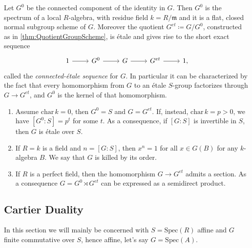 \begin{thm}\label{thm:ConnectedEtaleSequenceGS}
	Let $G^0$ be the connected component of the identity in $G$.
	Then $G^0$ is the spectrum of a local $R$-algebra, with residue field $k = R/\mathfrak{m}$
	and it is a flat, closed normal subgroup scheme of $G$.
	Moreover the quotient $G^{et} \coloneqq G/G^0$,
	constructed as in \cref{thm:QuotientGroupScheme},
	is étale and gives rise to the short exact sequence
	\begin{equation*}
	\begin{tikzcd}
		1 \arrow[r, "", rightarrow] &
		G^0 \arrow[r, "", rightarrow] &
		G \arrow[r, "", rightarrow] &
		G^{et} \arrow[r, "", rightarrow] &
		1
	,\end{tikzcd}
	\end{equation*}
	called the {\em connected-étale sequence} for $G$.
	In particular it can be characterized by the fact that every homomorphism
	from $G$ to an étale $S$-group factorizes through $G \to G^{et}$,
	and $G^0$ is the kernel of that homomorphism.
\end{thm}


\begin{prop}\label{prop:PropertiesConnectedEtale}
\leavevmode\vspace{-.2\baselineskip}
\begin{enumerate}
	\item Assume $\mathrm{char}\, k = 0$, then $G^0 = S$
		and $G = G^{et}$.
		If, instead, $\mathrm{char}\, k = p > 0$, we have
		$[G^0:S] = p^t$ for some $t$.
		As a consequence, if $[G:S]$ is invertible in $S$, then
		$G$ is étale over $S$.

	\item If $R = k$ is a field and $n = [G:S]$, then $x^n = 1$
		for all $x \in G(B)$ for any $k$-algebra $B$.
		We say that $G$ is killed by its order.

	\item If $R$ is a perfect field, then the homomorphism
		$G \to  G^{et}$ admits a section. 
		As a consequence $G = G^0 \rtimes G^{et}$
		can be expressed as a semidirect product.
\end{enumerate}
\end{prop}


\subsection{Cartier Duality}\label{CartierDualityGroups}
In this section we will mainly be concerned with $S = \mathrm{Spec}(R)$ affine
and $G$ finite commutative over $S$, hence affine, let's say $G = \mathrm{Spec}(A)$.


